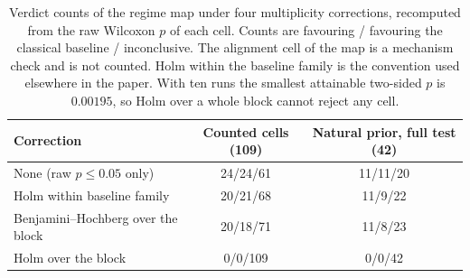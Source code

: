 \begin{table}[t]
\centering
\caption{Verdict counts of the regime map under four multiplicity corrections, recomputed
from the raw Wilcoxon $p$ of each cell. Counts are favouring \QSVM{} / favouring the classical
baseline / inconclusive. The alignment cell of the map is a mechanism check and is not counted.
Holm within the baseline family is the convention used elsewhere in
the paper. With ten runs the smallest attainable two-sided $p$ is $0.00195$, so Holm over a
whole block cannot reject any cell.}
\label{tab:multiplicity}
\footnotesize
\setlength{\tabcolsep}{4pt}
\begin{tabular}{@{}l cc@{}}
\toprule
Correction & Counted cells (109) & Natural prior, full test (42) \\
\midrule
None (raw $p\le0.05$ only) & 24/24/61 & 11/11/20 \\
Holm within baseline family & 20/21/68 & 11/9/22 \\
Benjamini--Hochberg over the block & 20/18/71 & 11/8/23 \\
Holm over the block & 0/0/109 & 0/0/42 \\
\bottomrule
\end{tabular}
\end{table}
